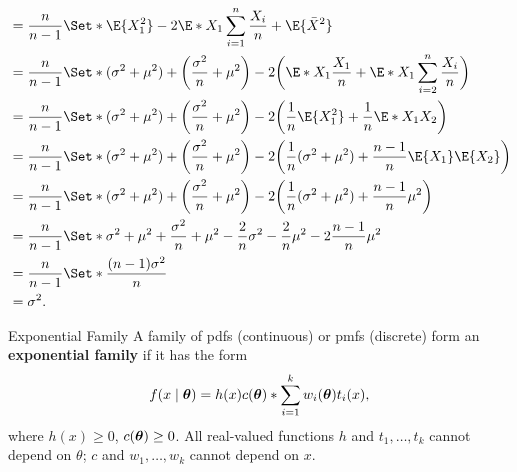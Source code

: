 \begin{Theorem}{}{}
\begin{enumerate}[(i)]
\begin{align*}
                   & =\frac{n}{n-1}\Set*{\E{X_1^2}-2\E*{X_1 \sum_{i=1}^{n}\frac{X_i}{n}}+\E{\bar{X}^2}}                                                                      \\
                   & =\frac{n}{n-1}\Set*{(\sigma^2+\mu^2)+\biggl(\frac{\sigma^2}{n}+\mu^2\biggr)-2\biggl(\E*{X_1 \frac{X_1}{n}}+\E*{X_1 \sum_{i=2}^{n}\frac{X_i}{n}}\biggr)} \\
                   & =\frac{n}{n-1}\Set*{(\sigma^2+\mu^2)+\biggl(\frac{\sigma^2}{n}+\mu^2\biggr)-2\biggl(\frac{1}{n}\E{X_1^2}+\frac{1}{n}\E*{X_1 X_2}\biggr)}                \\
                   & =\frac{n}{n-1}\Set*{(\sigma^2+\mu^2)+\biggl(\frac{\sigma^2}{n}+\mu^2\biggr)-2\biggl(\frac{1}{n}(\sigma^2+\mu^2)+\frac{n-1}{n}\E{X_1}\E{X_2}\biggr)}     \\
                   & =\frac{n}{n-1}\Set*{(\sigma^2+\mu^2)+\biggl(\frac{\sigma^2}{n}+\mu^2\biggr)-2\biggl(\frac{1}{n}(\sigma^2+\mu^2)+\frac{n-1}{n}\mu^2\biggr)}              \\
                   & =\frac{n}{n-1}\Set*{\sigma^2+\mu^2+\frac{\sigma^2}{n}+\mu^2-\frac{2}{n}\sigma^2-\frac{2}{n}\mu^2-2\frac{n-1}{n}\mu^2}                                   \\
                   & =\frac{n}{n-1}\Set*{\frac{(n-1)\sigma^2}{n}}                                                                                                            \\
                   & =\sigma^2.
              \end{align*}
    \end{enumerate}
\end{Theorem}
\begin{Definition}{Exponential Family}{}
    A family of pdfs (continuous) or pmfs (discrete) form an \textbf{exponential family} if it has the form
    \[ f(x\mid \bm{\theta})=h(x)c(\bm{\theta})\relax*{\sum_{i=1}^{k}w_i(\bm{\theta})t_i(x)}, \]
    where $ h(x)\ge 0 $, $ c(\bm{\theta})\ge 0 $. All real-valued functions $ h $ and $ t_1,\ldots,t_k $
    cannot depend on $ \theta $; $ c $ and $ w_1,\ldots,w_k $ cannot depend on $ x $.
\end{Definition}
